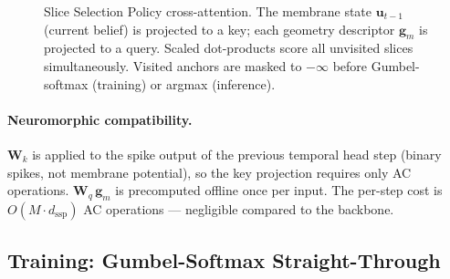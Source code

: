 \documentclass[11pt,a4paper]{article}
\begin{document}
\begin{figure}[H]
\caption{Slice Selection Policy cross-attention. The membrane state
         $\mathbf{u}_{t-1}$ (current belief) is projected to a key;
         each geometry descriptor $\mathbf{g}_m$ is projected to a query.
         Scaled dot-products score all unvisited slices simultaneously.
         Visited anchors are masked to $-\infty$ before
         Gumbel-softmax (training) or argmax (inference).}
\label{fig:ssp}
\end{figure}

\paragraph{Neuromorphic compatibility.}
$\mathbf{W}_k$ is applied to the spike output of the previous temporal head step
(binary spikes, not membrane potential), so the key projection requires only
AC operations. $\mathbf{W}_q\,\mathbf{g}_m$ is precomputed offline once per
input. The per-step cost is $O(M \cdot d_\text{ssp})$ AC operations ---
negligible compared to the backbone.

\subsection{Training: Gumbel-Softmax Straight-Through}
\end{document}
